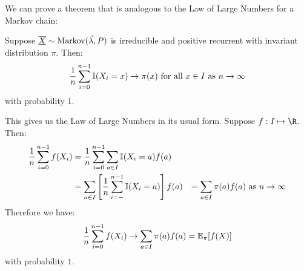 \documentclass[../Main.tex]{subfiles}
\begin{document}
We can prove a theorem that is analogous to the Law of Large Numbers for a Markov chain:
\begin{theorem}
    Suppose $\underline{\overline{X}} \sim \operatorname{Markov}(\vec{\lambda}, P)$ is irreducible and positive recurrent with invariant distribution $\pi$. Then:
    \begin{equation*}
        \frac1n \sum_{i=0}^{n-1} \mathbb{I}(X_i = x) \to \pi(x) \text{ for all $x \in I$ as $n \to \infty$}
    \end{equation*}
    with probability 1.
    \label{thmErgodic}
\end{theorem}
\begin{remark}
    This gives us the Law of Large Numbers in its usual form. Suppose $f : I \mapsto \R$. Then:
    \begin{align*}
        \frac1n \sum_{i=0}^{n-1} f(X_i)&= \frac1n \sum_{i=0}^{n-1} \sum_{a \in I} \mathbb{I}(X_i = a) f(a) \\
        &= \sum_{a \in I} \left[\frac1n \sum_{i=-}^{n-1} \mathbb{I}(X_i = a)\right] f(a)
        &= \sum_{a \in I} \pi(a) f(a) \text{ as $n \to \infty$}
    \end{align*}
    Therefore we have:
    \begin{equation*}
        \frac1n \sum_{i = 0}^{n -1} f(X_i) \to \sum_{a \in I} \pi(a) f(a) = \mathbb{E}_\pi[f(X)]
    \end{equation*}
    with probability $1$.
\end{remark}
\end{document}
